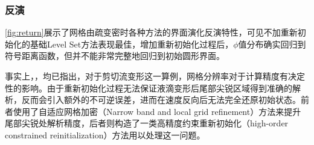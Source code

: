 \documentclass[11pt]{article}
\begin{document}
\subsubsection{反演}
\autoref{fig:return}展示了网格由疏变密时各种方法的界面演化反演特性，可见不加重新初始化的基础Level Set方法表现最佳，增加重新初始化过程后，$\phi$值分布确实回归到符号距离函数，但并不能非常完整地回归到初始圆形界面。

事实上，\citet{gomez_reinitialization_2005}，\citet{hartmann_constrained_2010}均已指出，对于剪切流变形这一算例，网格分辨率对于计算精度有决定性的影响。由于重新初始化过程无法保证液滴变形后尾部尖锐区域得到准确的解析，反而会引入额外的不可逆误差，进而在速度反向后无法完全还原初始状态。前者使用了自适应网格加密（Narrow band and local grid refinement）方法来提升尾部尖锐处解析精度，后者则构造了一类高精度约束重新初始化（high-order constrained reinitialization）方法用以处理这一问题。
\end{document}
